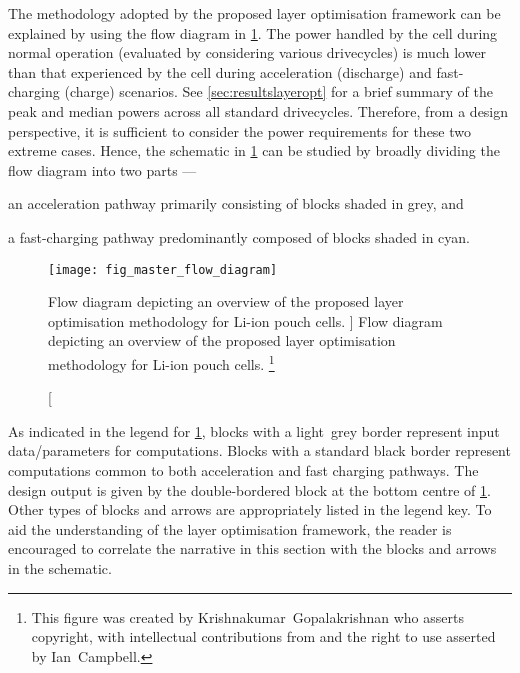 

The  methodology adopted  by the  proposed layer  optimisation framework  can be
explained by  using the  flow diagram in  \cref{fig:fig_strategy_schematic}. The
power  handled by  the cell  during normal  operation (evaluated  by considering
various  drivecycles)  is   much  lower  than  that  experienced   by  the  cell
during  acceleration  (discharge)  and  fast-charging  (charge)  scenarios.  See
\cref{sec:resultslayeropt} for  a brief  summary of the  peak and  median powers
across all  standard drivecycles.  Therefore, from a  design perspective,  it is
sufficient  to consider  the power  requirements  for these  two extreme  cases.
Hence,  the schematic  in  \cref{fig:fig_strategy_schematic} can  be studied  by
broadly dividing the flow diagram into two parts ---
\begin{enumerate*}[label=\roman*)]
    \item an acceleration pathway primarily consisting of blocks shaded in grey, and
    \item a fast-charging pathway predominantly composed of blocks shaded in cyan.
\end{enumerate*}

\begin{figure}[p]
    \begin{minipage}[t]{\textwidth}
        \centering
        \texttt{[image: fig\_master\_flow\_diagram]}
        \captionsetup{labelsep=note}
        \caption
        [%
        Flow diagram depicting an overview of the proposed layer optimisation methodology
        for Li-ion pouch cells.
        ]%
        {%
            Flow diagram depicting an overview of the proposed layer optimisation methodology
            for Li-ion pouch cells.
        }%
        \label{fig:fig_strategy_schematic}
        \mpfootnotes[1]
        \vspace*{0.7225cm}
        \footnote{This figure was created by \mbox{Krishnakumar Gopalakrishnan} who
            asserts copyright, with intellectual contributions from and the right to
        use asserted by \mbox{Ian Campbell}.}
    \end{minipage}
\end{figure}

As indicated in the legend  for \cref{fig:fig_strategy_schematic}, blocks with a
light~grey border represent input  data/parameters for computations. Blocks with
a standard black  border represent computations common to  both acceleration and
fast charging pathways. The design output  is given by the double-bordered block
at the bottom centre of \cref{fig:fig_strategy_schematic}. Other types of blocks
and arrows are appropriately listed in  the legend key. To aid the understanding
of the layer  optimisation framework, the reader is encouraged  to correlate the
narrative in this section with the blocks and arrows in the schematic.



